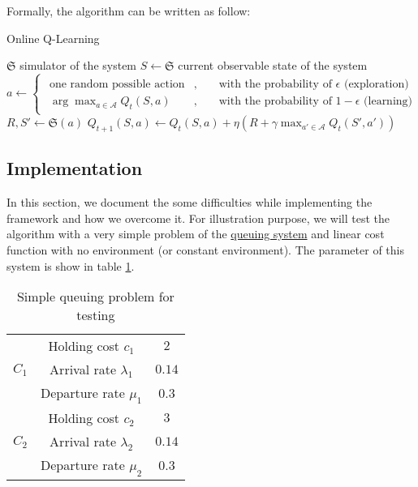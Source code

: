 \documentclass[
  a4paper, xcolor = usenames,dvipsnames]{article}
\begin{document}
Formally, the algorithm can be written as follow:

\begin{algorithm}
\caption{Online Q-Learning}\label{alg:on-q-learning}
$\mathfrak{S}$ simulator of the system\;
 {
  $S \gets \mathfrak{S}$ current observable state of the system\;
  $a \gets 
    \begin{cases}
    \begin{aligned}
      \text{one random possible action}&, && \text{ with the probability of } \epsilon \text{ (exploration)}\\ 
      \arg\max_{a \in \mathcal{A}} Q_{t}(S, a)&, && \text{ with the probability of } 1 - \epsilon \text{ (learning)}
    \end{aligned}
    \end{cases}
  $\\
  $R, S' \gets \mathfrak{S}(a)$\;
  $Q_{t+1}(S, a) \gets Q_{t}(S, a) + \eta (R + \gamma \max_{a' \in \mathcal{A}} Q_{t}(S', a'))$ \;
}
\end{algorithm}

\hypertarget{implementation}{%
\subsection{Implementation}\label{implementation}}

In this section, we document the some difficulties while implementing the framework and how we overcome it. For illustration purpose, we will test the algorithm with a very simple problem of the \protect\hyperlink{queuing-system}{queuing system}
and linear cost function with no environment (or constant environment). The parameter of this system is show in table \ref{tab:q-learning-test}.

\begin{table}[ht]
\caption{Simple queuing problem for testing}
\begin{center}
\begin{tabular}{c c c}
    \hline
    \multirow{3}{*}{$C_{1}$} & Holding cost $c_{1}$ & $2$ \\
    & Arrival rate $\lambda_{1}$ & $0.14$ \\
    & Departure rate $\mu_{1}$ & $0.3$ \\
    \cline{2-3}
    \multirow{3}{*}{$C_{2}$} & Holding cost $c_{2}$ & $3$ \\
    & Arrival rate $\lambda_{2}$ & $0.14$ \\
    & Departure rate $\mu_{2}$ & $0.3$ \\    
    \hline
\end{tabular}
\end{center}
\label{tab:q-learning-test}
\end{table}
\end{document}

